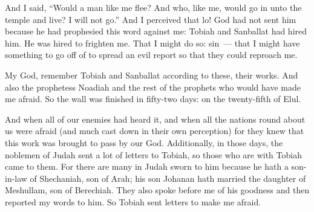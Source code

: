\begin{inparaenum}
    
     And I said, ``Would a man like me flee? And who, like me, would go in unto the temple and live? I will not go.''%
     And I perceived that lo! God had not sent him because he had prophesied this word against me: Tobiah and Sanballat had hired him.%
     He was hired to frighten me. That I might do so: sin~--- that I might have something to go off of to spread an evil report so that they could reproach me.%
    
     My God, remember Tobiah and Sanballat according to these, their works. And also the prophetess Noadiah and the rest of the prophets who would have made me afraid.%
     So the wall was finished in fifty-two days: on the twenty-fifth of Elul.%
    
     And when all of our enemies had heard it, and when all the nations round about us were afraid (and much cast down in their own perception) for they knew that this work was brought to pass by our God.%
     Additionally, in those days, the noblemen of Judah sent a lot of letters to Tobiah, so those who are with Tobiah came to them.%
     For there are many in Judah sworn to him because he hath a son-in-law of Shechaniah, son of Arah; his son Johanan hath married the daughter of Meshullam, son of Berechiah.%
     They also spoke before me of his goodness and then reported my words to him. So Tobiah sent letters to make me afraid.%
\end{inparaenum}

